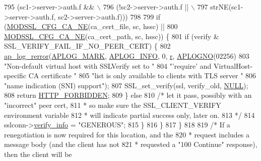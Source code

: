 \begin{DoxyCode}
{{795 \textcolor{preprocessor}{            (sc1->server->auth.f && \(\backslash\)}
796 \textcolor{preprocessor}{             (!sc2->server->auth.f || \(\backslash\)}
797 \textcolor{preprocessor}{              strNE(sc1->server->auth.f, sc2->server->auth.f)))}
798 
799             \textcolor{keywordflow}{if} (\hyperlink{ssl__engine__kernel_8c_a10a7fe563da61ef4e8d71ae940f7be52}{MODSSL\_CFG\_CA\_NE}(ca\_cert\_file, sc, hssc) ||
800                 \hyperlink{ssl__engine__kernel_8c_a10a7fe563da61ef4e8d71ae940f7be52}{MODSSL\_CFG\_CA\_NE}(ca\_cert\_path, sc, hssc)) \{
801                 \textcolor{keywordflow}{if} (verify & SSL\_VERIFY\_FAIL\_IF\_NO\_PEER\_CERT) \{
802                     \hyperlink{group__APACHE__CORE__LOG_ga4c112558ccffd6b363da102b2052d2a6}{ap\_log\_rerror}(\hyperlink{group__APACHE__CORE__LOG_ga655e126996849bcb82e4e5a14c616f4a}{APLOG\_MARK}, \hyperlink{group__APACHE__CORE__LOG_ga47fafbef7e478babdd92e90407f95b19}{APLOG\_INFO}, 0, 
      \hyperlink{group__APACHE__CORE__CONFIG_ga091cdd45984e865a888a4f8bb8fe107a}{r}, \hyperlink{group__APACHE__CORE__LOG_ga1dee8a07e06bc5b3de8b89662c2cd666}{APLOGNO}(02256)
803                          \textcolor{stringliteral}{"Non-default virtual host with SSLVerify set to "}
804                          \textcolor{stringliteral}{"'require' and VirtualHost-specific CA certificate "}
805                          \textcolor{stringliteral}{"list is only available to clients with TLS server "}
806                          \textcolor{stringliteral}{"name indication (SNI) support"});
807                     SSL\_set\_verify(ssl, verify\_old, \hyperlink{pcre_8txt_ad7f989d16aa8ca809a36bc392c07fba1}{NULL});
808                     \textcolor{keywordflow}{return} \hyperlink{group__HTTP__Status_ga92646f876056a1e5013e0050496dc04d}{HTTP\_FORBIDDEN};
809                 \} \textcolor{keywordflow}{else}
810                     \textcolor{comment}{/* let it pass, possibly with an "incorrect" peer cert,}
811 \textcolor{comment}{                     * so make sure the SSL\_CLIENT\_VERIFY environment variable}
812 \textcolor{comment}{                     * will indicate partial success only, later on.}
813 \textcolor{comment}{                     */}
814                     sslconn->\hyperlink{structSSLConnRec_a222765269058c8c8fa00113cdaf88b22}{verify\_info} = \textcolor{stringliteral}{"GENEROUS"};
815             \}
816         \}
817     \}
818 
819     \textcolor{comment}{/* If a renegotiation is now required for this location, and the}
820 \textcolor{comment}{     * request includes a message body (and the client has not}
821 \textcolor{comment}{     * requested a "100 Continue" response), then the client will be}
}}
\end{DoxyCode}

